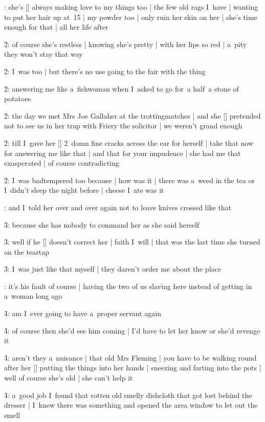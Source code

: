 :
she's [\milly] always making love to my things too |
the few old rags I~have |
wanting to put her hair up at~15 |
my powder too |
only ruin her skin on her |
she's time enough for that |
all her life after

\f2:
of course she's restless |
knowing she's pretty |
with her lips so red |
a~pity they won't stay that way

\f2:
I~was too |
but there's no use going to the fair with the thing

\f2:
answering me like a~fishwoman when I~asked to go for~a half~a stone of potatoes

\f2:
the day we met Mrs Joe Gallaher at the trottingmatches |
and she [\mrsjoeg] pretended not to see us in her trap with Friery the solicitor |
we weren't grand enough

\f2:
till I~gave her [\milly] 2~damn fine cracks across the ear for herself |
take that now for answering me like that |
and that for your impudence |
she had me that exasperated |
of course contradicting

\f2:
I~was badtempered too because |
how was it |
there was a~weed in the tea or I~didn't sleep the night before |
cheese I~ate was it

:
and I~told her over and over again not to leave knives crossed like that

\f3:
because she has nobody to command her as she said herself

\f3:
well if he [\bloom] doesn't correct her |
faith I~will |
that was the last time she turned on the teartap

\f3:
I~was just like that myself |
they daren't order me about the place

:
it's his fault of course |
having the two of us slaving here instead of getting in a~woman long ago

\f4:
am I~ever going to have a~proper servant again

\f4:
of course then she'd see him coming |
I'd have to let her know or she'd revenge it

\f4:
aren't they a~nuisance |
that old Mrs Fleming |
you have to be walking round after her [\mrsfleming]
putting the things into her hands |
sneezing and farting into the pots |
well of course she's old |
she can't help it

\f4:
a~good job I~found that rotten old smelly dishcloth that got lost behind the dresser |
I~knew there was something and opened the area window to let out the smell

